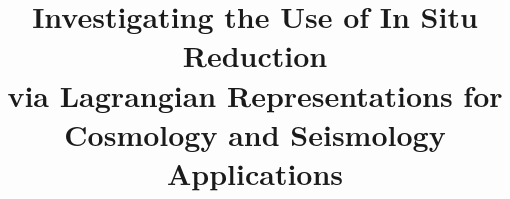 \documentclass[runningheads]{llncs}
\begin{document}
%
\title{Investigating the Use of In Situ Reduction \\via Lagrangian Representations for \\Cosmology and Seismology Applications}
%
%
%
%
%
\author{}
\institute{}
\maketitle              %
%
\begin{abstract}

\end{abstract}
%
%
%


\end{document}
